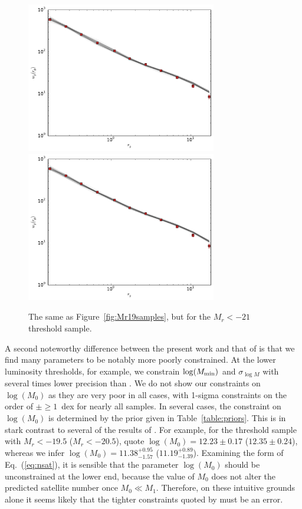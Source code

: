 \documentclass[usenatbib,usegraphicx,letterpaper]{mn2e}
\begin{document}
\begin{figure}
\begin{center}
\includegraphics[width=8.3cm]{Mr21samples.pdf}
\includegraphics[width=8.3cm]{Mr21ABsamples.pdf}
\caption{
The same as Figure~\ref{fig:Mr19samples}, but for the $M_r<-21$ threshold sample.
}
\label{fig:Mr21samples}
\end{center}
\end{figure}


A second noteworthy difference between the present work and that of \citet{zehavi_etal11} is that we 
find many parameters to be notably more poorly constrained. At the lower luminosity thresholds, for example, 
we constrain $\log (M_{\rm min})$ and $\sigma_{\log M}$ with several times lower precision than 
\citet{zehavi_etal11}. We do not show our constraints on $\log (M_0)$ as they are very poor in all cases, 
with 1-sigma constraints on the order of $\pm \ge 1$~dex for nearly all samples. In several cases, the constraint on 
$\log (M_0)$ is determined by the prior given in Table~\ref{table:priors}. This is in stark contrast to several of the 
results of \citet{zehavi_etal11}. For example, for the threshold sample with $M_r < -19.5$ ($M_r < -20.5$), 
\citet{zehavi_etal11} quote $\log (M_0) = 12.23 \pm 0.17$ ($12.35 \pm 0.24$), whereas we infer 
$\log (M_0) = 11.38^{+0.95}_{-1.57}$ ($11.19^{+0.89}_{-1.39}$). Examining the form of Eq.~(\ref{eq:nsat}), 
it is sensible that the parameter $\log (M_0)$ should be unconstrained at the lower end, because the 
value of $M_0$ does not alter the predicted satellite number once $M_0 \ll M_1$. 
Therefore, on these intuitive grounds alone it seems likely that the tighter constraints quoted by \citet{zehavi_etal11} must be an error. 
\end{document}
